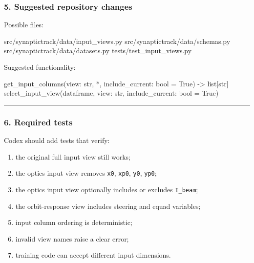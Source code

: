 \documentclass[
]{article}
\newenvironment{Shaded}{}{}
\newcommand{\BuiltInTok}[1]{\textcolor[rgb]{0.00,0.50,0.00}{#1}}
\newcommand{\NormalTok}[1]{#1}
\newcommand{\OperatorTok}[1]{\textcolor[rgb]{0.40,0.40,0.40}{#1}}
\newcommand{\VariableTok}[1]{\textcolor[rgb]{0.10,0.09,0.49}{#1}}
\providecommand{\tightlist}{%
  \setlength{\itemsep}{0pt}\setlength{\parskip}{0pt}}
\begin{document}
\hypertarget{suggested-repository-changes}{%
\subsubsection{5. Suggested repository
changes}\label{suggested-repository-changes}}

Possible files:

\begin{Shaded}
\begin{Highlighting}[]
\NormalTok{src/synaptictrack/data/input\_views.py}
\NormalTok{src/synaptictrack/data/schemas.py}
\NormalTok{src/synaptictrack/data/datasets.py}
\NormalTok{tests/test\_input\_views.py}
\end{Highlighting}
\end{Shaded}

Suggested functionality:

\begin{Shaded}
\begin{Highlighting}[]
\NormalTok{get\_input\_columns(view: }\BuiltInTok{str}\NormalTok{, }\OperatorTok{*}\NormalTok{, include\_current: }\BuiltInTok{bool} \OperatorTok{=} \VariableTok{True}\NormalTok{) }\OperatorTok{{-}\textgreater{}} \BuiltInTok{list}\NormalTok{[}\BuiltInTok{str}\NormalTok{]}
\NormalTok{select\_input\_view(dataframe, view: }\BuiltInTok{str}\NormalTok{, include\_current: }\BuiltInTok{bool} \OperatorTok{=} \VariableTok{True}\NormalTok{)}
\end{Highlighting}
\end{Shaded}

\begin{center}\rule{0.5\linewidth}{0.5pt}\end{center}

\hypertarget{required-tests}{%
\subsubsection{6. Required tests}\label{required-tests}}

Codex should add tests that verify:

\begin{enumerate}
\def\labelenumi{\arabic{enumi}.}
\tightlist
\item
  the original full input view still works;
\item
  the optics input view removes \texttt{x0}, \texttt{xp0}, \texttt{y0},
  \texttt{yp0};
\item
  the optics input view optionally includes or excludes
  \texttt{I\_beam};
\item
  the orbit-response view includes steering and equad variables;
\item
  input column ordering is deterministic;
\item
  invalid view names raise a clear error;
\item
  training code can accept different input dimensions.
\end{enumerate}
\end{document}
